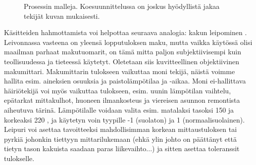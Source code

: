 \documentclass[12pt,a4paper,finnish]{tutthesis}
\begin{document}
\begin{figure}
  \begin{center}

    \caption[Prosessin malleja]{Prosessin malleja. Koesuunnittelussa on joskus
    hyödyllistä jakaa tekijät kuvan mukaisesti.}

    \label{fig:prosessi}
  \end{center}
\end{figure}




Käsitteiden hahmottamista voi helpottaa seuraava analogia: kakun leipominen
\parencite[ajatus otettu:][]{Sleeper2012}. Leivonnassa vasteena on yleensä
lopputuloksen maku, mutta vaikka käytössä olisi maailman parhaat makutuomarit,
on tämä mitta paljon subjektiivisempi kuin teollisuudessa ja tieteessä käytetyt.
Oletetaan siis kuvitteellinen objektiivinen makumittari. Makumittarin tulokseen
vaikuttaa moni tekijä, näistä voimme hallita esim. aineksien osuuksia ja
paistolämpötilaa ja -aikaa. Moni ei-hallittava häiriötekijä voi myös vaikuttaa
tulokseen, esim. uunin lämpötilan vaihtelu, epätarkat mittakulhot, huoneen
ilmankosteus ja viereisen asunnon remontista aiheutuva tärinä.
Lämpötilalle voidaan valita esim. matalaksi tasoksi 150 \celsius  ja korkeaksi
220 \celsius , ja käytetyn voin tyypille -1 (suolaton) ja 1 (normaalisuolainen).
Leipuri voi asettaa
tavoitteeksi mahdollisimman korkean mittaustuloksen tai pyrkiä johonkin
tiettyyn mittarilukemaan (ehkä ylin johto on päättänyt että tietyn tason
kakuista saadaan paras liikevaihto...) ja sitten asettaa toleranssit tulokselle.
\end{document}
